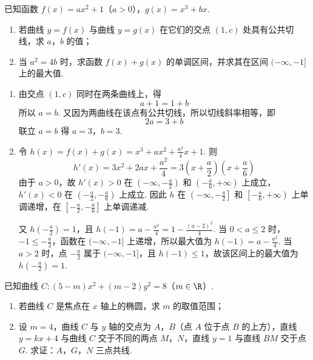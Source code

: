 \begin{problem}
已知函数 \(f(x)=ax^2+1\)（\(a>0\)），\(g(x)=x^3+bx\).

\begin{enumerate}
\item 若曲线 \(y=f(x)\) 与曲线 \(y=g(x)\) 在它们的交点 \((1,c)\) 处具有公共切线，求 \(a\)，\(b\) 的值；
\item 当 \(a^2=4b\) 时，求函数 \(f(x)+g(x)\) 的单调区间，并求其在区间 \((-\infty,-1]\) 上的最大值.
\end{enumerate}
\end{problem}

\begin{solution}
\begin{enumerate}
\item 由交点 \((1,c)\) 同时在两条曲线上，得
\[
a+1=1+b
\]
所以 \(a=b\). 又因为两曲线在该点有公共切线，所以切线斜率相等，即
\[
2a=3+b
\]
联立 \(a=b\) 得 \(a=3\)，\(b=3\).
\item 令 \(h(x)=f(x)+g(x)=x^3+ax^2+\frac{a^2}{4}x+1\). 则
\[
h'(x)=3x^2+2ax+\frac{a^2}{4}=3\left(x+\frac a2\right)\left(x+\frac a6\right)
\]
由于 \(a>0\)，故 \(h'(x)>0\) 在 \(\left(-\infty,-\frac a2\right)\) 和 \(\left(-\frac a6,+\infty\right)\) 上成立，\(h'(x)<0\) 在 \(\left(-\frac a2,-\frac a6\right)\) 上成立. 因此 \(h\) 在 \(\left(-\infty,-\frac a2\right]\) 和 \(\left[-\frac a6,+\infty\right)\) 上单调递增，在 \(\left[-\frac a2,-\frac a6\right]\) 上单调递减.

又 \(h\left(-\frac a2\right)=1\)，且 \(h(-1)=a-\frac{a^2}{4}=1-\frac{(a-2)^2}{4}\).
当 \(0<a\leqslant2\) 时，\(-1\leqslant-\frac a2\)，函数在 \((-\infty,-1]\) 上递增，所以最大值为 \(h(-1)=a-\frac{a^2}{4}\). 当 \(a>2\) 时，点 \(-\frac a2\) 属于 \((-\infty,-1]\)，且 \(h(-1)\leqslant1\)，故该区间上的最大值为 \(h\left(-\frac a2\right)=1\).
\end{enumerate}
\end{solution}

\begin{problem}
已知曲线 \(C:(5-m)x^2+(m-2)y^2=8\)（\(m\in\R\)）.

\begin{enumerate}
\item 若曲线 \(C\) 是焦点在 \(x\) 轴上的椭圆，求 \(m\) 的取值范围；
\item 设 \(m=4\)，曲线 \(C\) 与 \(y\) 轴的交点为 \(A\)，\(B\)（点 \(A\) 位于点 \(B\) 的上方），直线 \(y=kx+4\) 与曲线 \(C\) 交于不同的两点 \(M\)，\(N\)，直线 \(y=1\) 与直线 \(BM\) 交于点 \(G\). 求证：\(A\)，\(G\)，\(N\) 三点共线.
\end{enumerate}
\end{problem}

